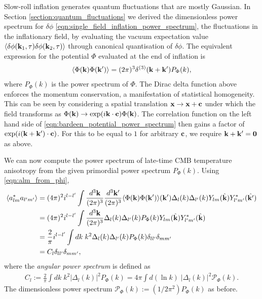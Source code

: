 Slow-roll inflation generates quantum fluctuations that are mostly Gaussian. In Section \ref{section:quantum_fluctuations} we derived the dimensionless power spectrum for $\delta\phi$ \eqref{eqn:single_field_inflation_power_spectrum}, the fluctuations in the inflationary field, by evaluating the vacuum expectation value $\langle \delta\phi(\mathbf{k}_1,\tau) \delta\phi(\mathbf{k}_2,\tau) \rangle$ through canonical quantisation of $\delta\phi$. The equivalent expression for the potential $\Phi$ evaluated at the end of inflation is
\begin{align}
	\langle \Phi (\mathbf{k}) \Phi (\mathbf{k}') \rangle = (2\pi)^3 \delta^{(3)} (\mathbf{k} + \mathbf{k}') P_\Phi (k), \label{eqn:bardeen_potential_power_spectrum}
\end{align}
where $P_\Phi (k)$ is the power spectrum of $\Phi$. The Dirac delta function above enforces the momentum conservation, a manifestation of statistical homogeneity. This can be seen by considering a spatial translation $\mathbf{x} \rightarrow \mathbf{x}+\mathbf{c}$ under which the field transforms as $\Phi(\mathbf{k}) \rightarrow \exp(i\mathbf{k}\cdot\mathbf{c}) \Phi(\mathbf{k})$. The correlation function on the left hand side of \eqref{eqn:bardeen_potential_power_spectrum} then gains a factor of $\exp(i(\mathbf{k}+\mathbf{k}')\cdot\mathbf{c})$. For this to be equal to $1$ for arbitrary $\mathbf{c}$, we require $\mathbf{k}+\mathbf{k}'=\mathbf{0}$ as above.

We can now compute the power spectrum of late-time CMB temperature anisotropy from the given primordial power spectrum $P_\Phi(k)$. Using \eqref{eqn:alm_from_phi},
\begin{align}
	\langle a^*_{lm} a_{l'm'} \rangle &= (4\pi)^2 i^{l-l'} \int \frac{d^3\mathbf{k}}{(2\pi)^3} \frac{d^3\mathbf{k'}}{(2\pi)^3} \langle \Phi (\mathbf{k}) \Phi (\mathbf{k}') \rangle (\mathbf{k}') \Delta_l (k) \Delta_{l'} (k) Y_{lm}(\hat{\mathbf{k}}) Y^*_{l'm'}(\hat{\mathbf{k}'})  \\
	&= (4\pi)^2 i^{l-l'} \int \frac{d^3\mathbf{k}}{(2\pi)^3} \Delta_l (k) \Delta_{l'} (k) P_\Phi(k) Y_{lm}(\hat{\mathbf{k}}) Y^*_{l'm'}(\hat{\mathbf{k}}) \\
	&= \frac{2}{\pi} i^{l-l'} \int dk \; k^2  \Delta_l (k) \Delta_{l'} (k) P_\Phi (k) \delta_{ll'} \delta_{mm'} \\
	&= C_{l} \delta_{ll'} \delta_{mm'}, \label{eqn:angular_power_spectrum_form}
\end{align}
where the \textit{angular power spectrum} is defined as
\begin{align}
		C_l := \frac{2}{\pi} \int dk \; k^2 |\Delta_l(k)|^2 P_\Phi (k) = 4\pi \int d(\ln k) \; |\Delta_l(k)|^2 \mathcal{P}_\Phi (k).
\end{align}
The dimensionless power spectrum $\mathcal{P}_\Phi(k) := (1/2\pi^2) P_\Phi(k)$ as before.

